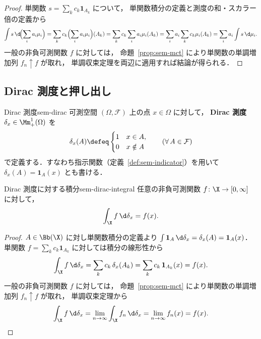 \begin{proof}
  単関数 $s = \sum_{k} c_k \mathbf{1}_{A_k}$ について，
  単関数積分の定義と測度の和・スカラー倍の定義から
  \[
    \int s \, \d\!\Bigl(\sum_i a_i \mu_i\Bigr)
    = \sum_k c_k \Bigl(\sum_i a_i \mu_i\Bigr)(A_k)
    = \sum_k c_k \sum_i a_i \mu_i(A_k)
    = \sum_i a_i \sum_k c_k \mu_i(A_k)
    = \sum_i a_i \int s \, \d\mu_i.
  \]
  一般の非負可測関数 $f$ に対しては，
  命題~\ref{prop:sem-mct} により単関数の単調増加列 $f_n \uparrow f$ が取れ，
  単調収束定理を両辺に適用すれば結論が得られる．
\end{proof}

\subsection{Dirac 測度と押し出し}
\label{sec:sem-dirac-pushforward}

\begin{definition}{Dirac 測度}{sem-dirac}
  可測空間 $(\Omega, \mathcal{F})$ 上の点 $x \in \Omega$ に対して，
  \textbf{Dirac 測度} $\delta_x \in \Mm_+^1(\Omega)$ を
  \[
    \delta_x(A) \defeq
    \begin{cases}
      1 & x \in A, \\
      0 & x \notin A
    \end{cases}
    \qquad (\forall\, A \in \mathcal{F})
  \]
  で定義する．すなわち指示関数（定義~\ref{def:sem-indicator}）を用いて
  $\delta_x(A) = \mathbf{1}_A(x)$ とも書ける．
\end{definition}

\begin{claim}{Dirac 測度に対する積分}{sem-dirac-integral}
  任意の非負可測関数 $f \colon \X \to [0, \infty]$ に対して，
  \[
    \int_\X f \, \d\delta_x = f(x).
  \]
\end{claim}

\begin{proof}
  $A \in \Bb(\X)$ に対し単関数積分の定義より
  $\int \mathbf{1}_A \, \d\delta_x = \delta_x(A) = \mathbf{1}_A(x)$．
  単関数 $f = \sum_k c_k \mathbf{1}_{A_k}$ に対しては積分の線形性から
  \[
    \int_\X f \, \d\delta_x
    = \sum_k c_k \, \delta_x(A_k)
    = \sum_k c_k \, \mathbf{1}_{A_k}(x)
    = f(x).
  \]
  一般の非負可測関数 $f$ に対しては，
  命題~\ref{prop:sem-mct} により単関数の単調増加列 $f_n \uparrow f$ が取れ，
  単調収束定理から
  \[
    \int_\X f \, \d\delta_x
    = \lim_{n \to \infty} \int_\X f_n \, \d\delta_x
    = \lim_{n \to \infty} f_n(x)
    = f(x).
  \]
\end{proof}

